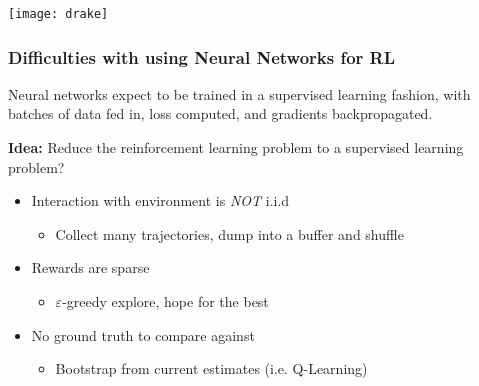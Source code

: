 \documentclass[10pt,a4paper, handout]{beamer}
\begin{document}
\begin{frame}
	\centering
		\texttt{[image: drake]}
\end{frame}

\begin{frame}
	\frametitle{Difficulties with using Neural Networks for RL}
	
	
		Neural networks expect to be trained in a supervised learning fashion,
		with batches of data fed in, loss computed, and gradients backpropagated.  
	
	
	\textbf{Idea:} Reduce the reinforcement learning problem
	to a supervised learning problem?
		
		\begin{itemize}
		\item Interaction with environment is \textit{NOT} i.i.d
		\begin{itemize}
			\pause
			\item Collect many trajectories, dump into a buffer and shuffle
		\end{itemize}
		\pause
		\item Rewards are sparse
		\begin{itemize}
			\pause
			\item $\varepsilon$-greedy explore, hope for the best
		\end{itemize}
		\pause
		\item No ground truth to compare against
		\begin{itemize}
			\pause
			\item Bootstrap from current estimates (i.e. Q-Learning)
		\end{itemize}
	\end{itemize}
\end{frame}
\end{document}

